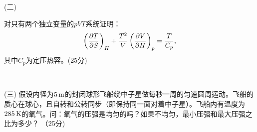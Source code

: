 \documentclass[12pt,CJK]{article}
\begin{document}
\item[(二)]{
  对只有两个独立变量的$pVT$系统证明：
  $$\left(\frac{\partial T}{\partial S}\right)_{H} +\frac{T^2}{V} \left(\frac{\partial V}{\partial H}\right)_{p} = \frac{T}{C_p}, $$
  其中$C_p$为定压热容。(25分)
  
  \vspace{5in}
  }

\item[]{\

  \vspace{2 in}}  
\item[(三)]{ 假设内径为$5\,\mathrm{m}$的封闭球形飞船绕中子星做每秒一周的匀速圆周运动。飞船的质心在球心，且自转和公转同步（即保持同一面对着中子星）。飞船内有温度为$285\,\mathrm{K}$的氧气。问：氧气的压强是均匀的吗？如果不均匀，最小压强和最大压强之比为多少？ （25分)   
  }
  
  
\eitem


\ech
\end{document}
